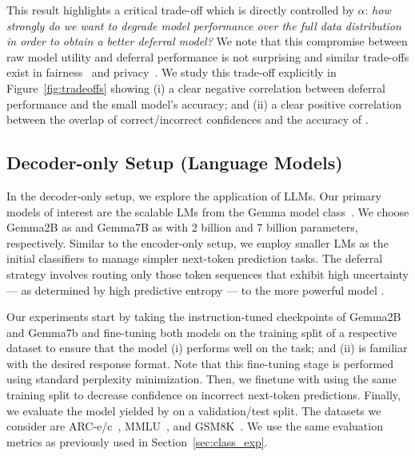 This result highlights a critical trade-off which is directly controlled by $\alpha$: \emph{how strongly do we want to degrade model performance over the full data distribution in order to obtain a better deferral model?} We note that this compromise between raw model utility and deferral performance is not surprising and similar trade-offs exist in fairness~\citep{dutta2020there, yaghini2023learning} and privacy~\citep{abadi2016deep, rabanser2023training}. We study this trade-off explicitly in Figure~\ref{fig:tradeoffs} showing (i) a clear negative correlation between deferral performance and the small model's accuracy; and (ii) a clear positive correlation between the overlap of correct/incorrect confidences and the accuracy of \smallmodel. 

\subsection{Decoder-only Setup (Language Models)}
\label{sec:lang_exp}

In the decoder-only setup, we explore the application of LLMs. Our primary models of interest are the scalable LMs from the Gemma model class~\citep{team2024gemma}. We choose Gemma2B as \smallmodel and Gemma7B as \bigmodel with 2 billion and 7 billion parameters, respectively. Similar to the encoder-only setup, we employ smaller LMs as the initial classifiers to manage simpler next-token prediction tasks. The deferral strategy involves routing only those token sequences that exhibit high uncertainty --- as determined by high predictive entropy --- to the more powerful model \bigmodel.

Our experiments start by taking the instruction-tuned checkpoints of Gemma2B and Gemma7b and fine-tuning both models on the training split of a respective dataset to ensure that the model (i) performs well on the task; and (ii) is familiar with the desired response format. Note that this fine-tuning stage is performed using standard perplexity minimization. Then, we finetune \smallmodel with \loss using the same training split to decrease confidence on incorrect next-token predictions. Finally, we evaluate the model yielded by \loss on a validation/test split. The datasets we consider are ARC-e/c~\citep{clark2018think}, MMLU~\citep{hendrycks2020measuring}, and GSM8K~\citep{cobbe2021training}. We use the same evaluation metrics as previously used in Section~\ref{sec:class_exp}.

